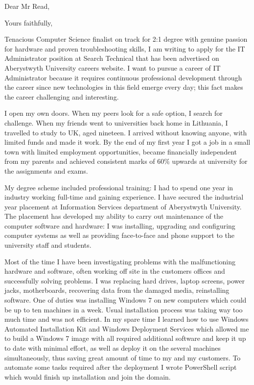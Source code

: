 \documentclass[11pt,a4paper,sans]{moderncv}        %
\begin{document}
\date{\today}
\opening{Dear Mr Read,}
\closing{Yours faithfully,}
\makelettertitle

Tenacious Computer Science finalist on track for 2:1 degree with genuine passion for hardware and proven troubleshooting skills, I am writing to apply for the IT Administrator position at Search Technical that has been advertised on Aberystwyth University careers website. I want to pursue a career of IT Administrator because it requires continuous professional development through the career since new technologies in this field emerge every day; this fact makes the career challenging and interesting.

I open my own doors. When my peers look for a safe option, I search for challenge. When my friends went to universities back home in Lithuania, I travelled to study to UK, aged nineteen. I arrived without knowing anyone, with limited funds and made it work. By the end of my first year I got a job in a small town with limited employment opportunities, became financially independent from my parents and achieved consistent marks of 60\% upwards at university for the assignments and exams.

My degree scheme included professional training: I had to spend one year in industry working full-time and gaining experience.  I have secured the industrial year placement at Information Services department of Aberystwyth University. The placement has developed my ability to carry out maintenance of the computer software and hardware: I was installing, upgrading and configuring computer systems as well as providing face-to-face and phone support to the university staff and students. 

Most of the time I have been investigating problems with the malfunctioning hardware and software, often working off site in the customers offices and successfully solving problems. I was replacing hard drives, laptop screens, power jacks, motherboards, recovering data from the damaged media, reinstalling software. One of duties was installing Windows 7 on new computers which could be up to ten machines in a week. Usual installation process was taking way too much time and was not efficient. In my spare time I learned how to use Windows Automated Installation Kit and Windows Deployment Services which allowed me to build a Windows 7 image with all required additional software and keep it up to date with minimal effort, as well as deploy it on the several machines simultaneously, thus saving great amount of time to my and my customers. To automate some tasks required after the deployment I wrote PowerShell script which would finish up installation and join the domain. 
\end{document}
